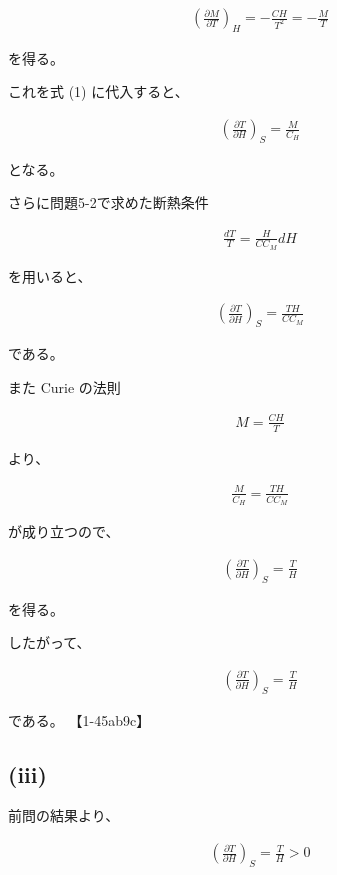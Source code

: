 \documentclass[platex,dvipdfmx,a4paper]{jsarticle}
\begin{document}
\begin{align*}
\left(
\frac{\partial M}{\partial T}
\right)_H
=
-\frac{CH}{T^2}
=
-\frac{M}{T}
\end{align*}

を得る。

これを式 (1) に代入すると、

\begin{align*}
\left(
\frac{\partial T}{\partial H}
\right)_S
=
\frac{M}{C_H}
\end{align*}

となる。

さらに問題5-2で求めた断熱条件

\begin{align*}
\frac{dT}{T}
=
\frac{H}{CC_M}dH
\end{align*}

を用いると、

\begin{align*}
\left(
\frac{\partial T}{\partial H}
\right)_S
=
\frac{TH}{CC_M}
\end{align*}

である。

また Curie の法則

\begin{align*}
M=\frac{CH}{T}
\end{align*}

より、

\begin{align*}
\frac{M}{C_H}
=
\frac{TH}{CC_M}
\end{align*}

が成り立つので、

\begin{align*}
\left(
\frac{\partial T}{\partial H}
\right)_S
=
\frac{T}{H}
\end{align*}

を得る。

したがって、

\begin{align*}
\left(
\frac{\partial T}{\partial H}
\right)_S
=
\frac{T}{H}
\end{align*}

である。 【1-45ab9c】

\subsection{(iii)}

前問の結果より、

\begin{align*}
\left(
\frac{\partial T}{\partial H}
\right)_S
=
\frac{T}{H}
>0
\end{align*}
\end{document}
